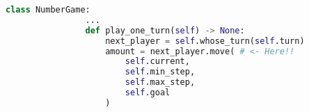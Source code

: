 \documentclass[12pt]{article}
\begin{document}
\begin{enumerate}[1.]
\begin{mdframed}
\begin{enumerate}[1.]
\begin{mdframed}
            \begin{lstlisting}[language=Python]
            class NumberGame:
                ...
                def play_one_turn(self) -> None:
                    next_player = self.whose_turn(self.turn)
                    amount = next_player.move( # <- Here!!
                        self.current,
                        self.min_step,
                        self.max_step,
                        self.goal
                    )
            \end{lstlisting}

            \end{mdframed}

        \end{enumerate}

    \end{mdframed}


\end{enumerate}
\end{document}
